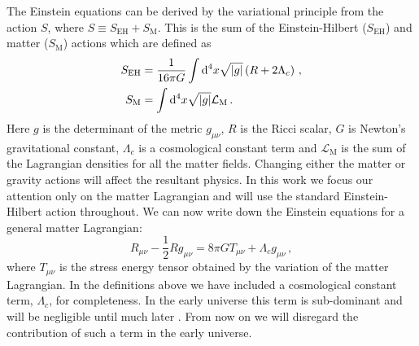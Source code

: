 The Einstein equations can be derived by the variational principle from the
action $S$, where $S\equiv S_\mathrm{EH} + S_\mathrm{M}$. This is the sum
of the
Einstein-Hilbert ($S_\mathrm{EH}$) and matter ($S_\mathrm{M}$) actions which are
defined as 
% 
\begin{align}
\label{eq:EHeqn-intro}
 S_\mathrm{EH} &= \frac{1}{16\pi G}\int \mathrm{d}^4 x \sqrt{|g|} \left(R +
2\Lambda_c\right) \,,\\
\label{eq:matteraction-intro}
 S_\mathrm{M} &= \int \mathrm{d}^4 x \sqrt{|g|}
\mathcal{L}_\mathrm{M} \,.
\end{align}
%
Here $g$ is the determinant of the metric $g_{\mu\nu}$, $R$ is the Ricci
scalar, $G$ is Newton's gravitational constant, $\Lambda_c$ is a cosmological
constant term 
and $\mathcal{L}_\mathrm{M}$ is the sum of the Lagrangian densities
for all the matter fields.
Changing either the matter or gravity actions will affect the
resultant physics. In this work we focus our attention only on the matter
Lagrangian and will use the standard Einstein-Hilbert action throughout.
We can now write down the Einstein equations for a general matter Lagrangian:
% 
\begin{equation}
\label{eq:einstein-intro}
 R_{\mu\nu} - \frac{1}{2}R g_{\mu\nu} = 8\pi G T_{\mu\nu} + \Lambda_c
g_{\mu\nu}\,,
\end{equation}
% 
where $T_{\mu\nu}$ is the stress energy tensor obtained by the variation of the
matter Lagrangian. 
In the definitions above we have included a
cosmological constant term, $\Lambda_c$, for completeness. In the early
universe this term is sub-dominant and will be negligible until much later
\cite{book:liddle}. From now on we will
disregard the contribution of such a term in the early universe.


